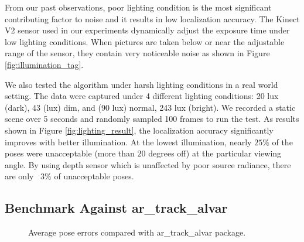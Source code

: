 From our past observations, poor lighting condition is the most significant contributing factor to noise and it results in low localization accuracy. The Kinect V2 sensor used in our experiments dynamically adjust the exposure time under low lighting conditions. When pictures are taken below or near the adjustable range of the sensor, they contain very noticeable noise as shown in Figure \ref{fig:illumination_tag}.

We also tested the algorithm under harsh lighting conditions in a real world setting. The data were captured under 4 different lighting conditions: 20 lux (dark), 43 (lux) dim, and (90 lux) normal, 243 lux (bright). We recorded a static scene over 5 seconds and randomly sampled 100 frames to run the test.  As results shown in Figure \ref{fig:lighting_result}, the localization accuracy significantly improves with better illumination. At the lowest illumination, nearly $25\%$ of the poses were unacceptable (more than $20$ degrees off) at the particular viewing angle. By using depth sensor which is unaffected by poor source radiance, there are only ~$3\%$ of unacceptable poses.

\subsection{Benchmark Against ar\_track\_alvar}

\begin{figure}
\centering
{}
\caption{Average pose errors compared with ar\_track\_alvar package.}
\label{fig:alvartrack}
\end{figure}

